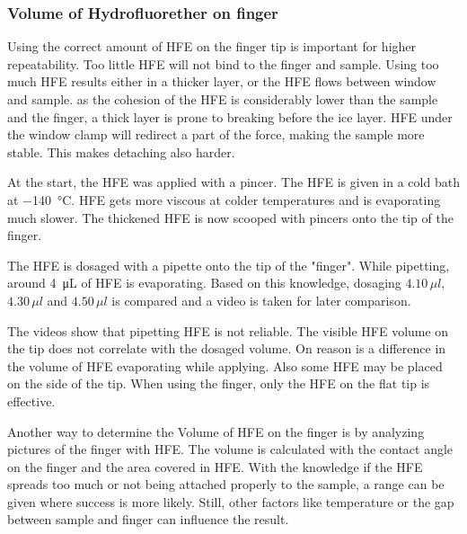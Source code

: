 
\subsubsection{Volume of Hydrofluorether on finger}


Using the correct amount of HFE on the finger tip is important for higher repeatability. Too little HFE will not bind to the finger and sample. Using too much HFE results either in a thicker layer, or the HFE flows between window and sample. as the cohesion of the HFE is considerably lower than the sample and the finger, a thick layer is prone to breaking before the ice layer. HFE under the window clamp will redirect a part of the force, making the sample more stable. This makes detaching also harder.

At the start, the HFE was applied with a pincer. The HFE is given in a cold bath at \SI{-140}{\degreeCelsius}. HFE gets more viscous at colder temperatures and is evaporating much slower. The thickened HFE is now scooped with pincers onto the tip of the finger.


The HFE is dosaged with a pipette onto the tip of the "finger". While pipetting, around \SI{4}{\micro\liter} of HFE is evaporating. Based on this knowledge, dosaging $4.10\,\mu l$, $4.30\,\mu l$ and $4.50\,\mu l$ is compared and a video is taken for later comparison.

The videos show that pipetting HFE is not reliable. The visible HFE volume on the tip does not correlate with the dosaged volume. On reason is a difference in the volume of HFE evaporating while applying. Also some HFE may be placed on the side of the tip. When using the finger, only the HFE on the flat tip is effective.

Another way to determine the Volume of HFE on the finger is by analyzing pictures of the finger with HFE. The volume is calculated with the contact angle on the finger and the area covered in HFE. With the knowledge if the HFE spreads too much or not being attached properly to the sample, a range can be given where success is more likely. Still, other factors like temperature or the gap between sample and finger can influence the result.

